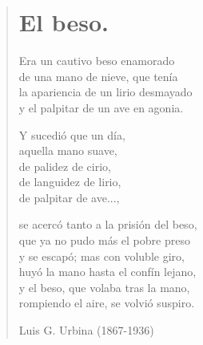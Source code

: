 \documentclass[12pt, twoside]{book}
\begin{document}
\begin{verse}
\begin{center}
\section{El beso.}
\end{center}

Era un cautivo beso enamorado\\
de una mano de nieve, que tenía\\
la apariencia de un lirio desmayado\\
y el palpitar de un ave en agonia.\newline

\qquad Y sucedió que un día,\\
\qquad aquella mano suave,\\
\qquad de palidez de cirio,\\
\qquad de languidez de lirio,\\
\qquad de palpitar de ave...,\newline

se acercó tanto a la prisión del beso,\\
que ya no pudo más el pobre preso\\
y se escapó; mas con voluble giro,\\
huyó la mano hasta el confín lejano,\\
y el beso, que volaba tras la mano,\\
rompiendo el aire, se volvió suspiro.\newline

Luis G. Urbina (1867-1936)
\end{verse}
\newpage
\end{document}
